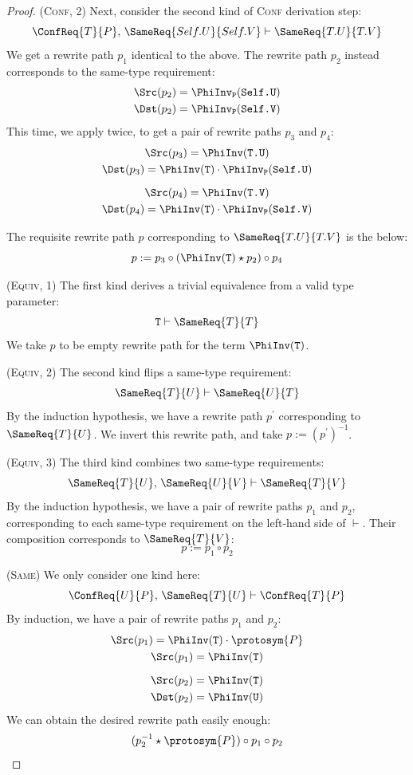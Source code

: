 \documentclass[../generics]{subfiles}
\begin{document}
\begin{proof}
(\textsc{Conf}, 2) Next, consider the second kind of \textsc{Conf} derivation step:
\[\ConfReq{T}{P},\,\SameReq{Self.U}{Self.V}\vdash\SameReq{T.U}{T.V}\]
We get a rewrite path $p_1$ identical to the above. The rewrite path $p_2$ instead corresponds to the same-type requirement:
\begin{gather*}
\Src(p_2)=\PhiInv_\texttt{P}(\texttt{Self.U})\\
\Dst(p_2)=\PhiInv_\texttt{P}(\texttt{Self.V})
\end{gather*}
This time, we apply  twice, to get a pair of rewrite paths $p_3$ and $p_4$:
\begin{gather*}
\Src(p_3) = \PhiInv(\texttt{T.U})\\
\Dst(p_3) = \PhiInv(\texttt{T})\cdot\PhiInv_\texttt{P}(\texttt{Self.U})\\[\medskipamount]
\Src(p_4) = \PhiInv(\texttt{T.V})\\
\Dst(p_4) = \PhiInv(\texttt{T})\cdot\PhiInv_\texttt{P}(\texttt{Self.V})
\end{gather*}

The requisite rewrite path $p$ corresponding to $\SameReq{T.U}{T.V}$ is the below:
\[p := p_3 \circ (\PhiInv(\texttt{T}) \star p_2) \circ p_4\]

(\textsc{Equiv}, 1) The first kind derives a trivial equivalence from a valid type parameter:
\[\texttt{T}\vdash\SameReq{T}{T}\]
We take $p$ to be empty rewrite path for the term $\PhiInv(\texttt{T})$.

(\textsc{Equiv}, 2) The second kind flips a same-type requirement:
\[\SameReq{T}{U}\vdash\SameReq{U}{T}\]
By the induction hypothesis, we have a rewrite path $p^\prime$ corresponding to $\SameReq{T}{U}$. We invert this rewrite path, and take $p := (p^\prime)^{-1}$.

(\textsc{Equiv}, 3) The third kind combines two same-type requirements:
\[\SameReq{T}{U},\,\SameReq{U}{V}\vdash\SameReq{T}{V}\]
By the induction hypothesis, we have a pair of rewrite paths $p_1$ and $p_2$, corresponding to each same-type requirement on the left-hand side of $\vdash$. Their composition corresponds to $\SameReq{T}{V}$:
\[p:=p_1\circ p_2\]

(\textsc{Same}) We only consider one kind here:
\[\ConfReq{U}{P},\,\SameReq{T}{U}\vdash\ConfReq{T}{P}\]
By induction, we have a pair of rewrite paths $p_1$ and $p_2$:
\begin{gather*}
\Src(p_1)=\PhiInv(\texttt{T})\cdot\protosym{P}\\
\Src(p_1)=\PhiInv(\texttt{T})\\[\medskipamount]
\Src(p_2)=\PhiInv(\texttt{T})\\
\Dst(p_2)=\PhiInv(\texttt{U})
\end{gather*}
We can obtain the desired rewrite path easily enough:
\[(p_2^{-1} \star \protosym{P}) \circ p_1 \circ p_2\]


\end{proof}
\end{document}
